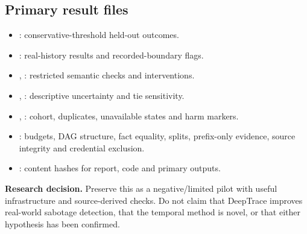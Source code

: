 \documentclass[10pt,letterpaper]{article}
\newcommand{\note}[1]{\par\noindent\colorbox{pale}{\parbox{\dimexpr\linewidth-2\fboxsep\relax}{#1}}\par}
\begin{document}
\subsection*{Primary result files}
\begin{itemize}
\item {}: conservative-threshold held-out outcomes.
\item {}: real-history results and recorded-boundary flags.
\item {}, : restricted semantic checks and interventions.
\item {}, : descriptive uncertainty and tie sensitivity.
\item {}, : cohort, duplicates, unavailable states and harm markers.
\item {}: budgets, DAG structure, fact equality, splits, prefix-only evidence, source integrity and credential exclusion.
\item {}: content hashes for report, code and primary outputs.
\end{itemize}

\note{\textbf{Research decision.} Preserve this as a negative/limited pilot with useful infrastructure and source-derived checks. Do not claim that DeepTrace improves real-world sabotage detection, that the temporal method is novel, or that either hypothesis has been confirmed.}
\end{document}
